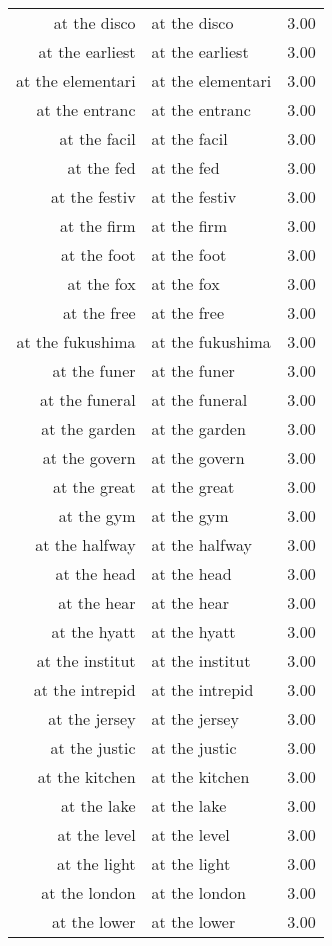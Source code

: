 \begin{table}[ht]
\begin{tabular}{rlr}
  at the disco & at the disco & 3.00 \\ 
  at the earliest & at the earliest & 3.00 \\ 
  at the elementari & at the elementari & 3.00 \\ 
  at the entranc & at the entranc & 3.00 \\ 
  at the facil & at the facil & 3.00 \\ 
  at the fed & at the fed & 3.00 \\ 
  at the festiv & at the festiv & 3.00 \\ 
  at the firm & at the firm & 3.00 \\ 
  at the foot & at the foot & 3.00 \\ 
  at the fox & at the fox & 3.00 \\ 
  at the free & at the free & 3.00 \\ 
  at the fukushima & at the fukushima & 3.00 \\ 
  at the funer & at the funer & 3.00 \\ 
  at the funeral & at the funeral & 3.00 \\ 
  at the garden & at the garden & 3.00 \\ 
  at the govern & at the govern & 3.00 \\ 
  at the great & at the great & 3.00 \\ 
  at the gym & at the gym & 3.00 \\ 
  at the halfway & at the halfway & 3.00 \\ 
  at the head & at the head & 3.00 \\ 
  at the hear & at the hear & 3.00 \\ 
  at the hyatt & at the hyatt & 3.00 \\ 
  at the institut & at the institut & 3.00 \\ 
  at the intrepid & at the intrepid & 3.00 \\ 
  at the jersey & at the jersey & 3.00 \\ 
  at the justic & at the justic & 3.00 \\ 
  at the kitchen & at the kitchen & 3.00 \\ 
  at the lake & at the lake & 3.00 \\ 
  at the level & at the level & 3.00 \\ 
  at the light & at the light & 3.00 \\ 
  at the london & at the london & 3.00 \\ 
  at the lower & at the lower & 3.00 \\ 

\end{tabular}
\end{table}
